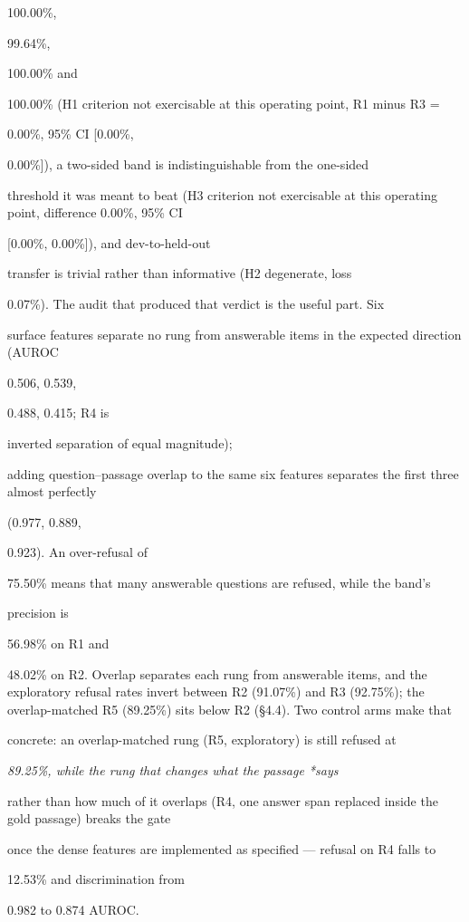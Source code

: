 100.00\%,

99.64\%,

100.00\% and

100.00\% (H1 criterion not exercisable at this operating point, R1 minus R3 =

0.00\%, 95\% CI [0.00\%,

0.00\%]), a two-sided band is indistinguishable from the one-sided

threshold it was meant to beat (H3 criterion not exercisable at this operating point, difference 0.00\%, 95\% CI

[0.00\%, 0.00\%]), and dev-to-held-out

transfer is trivial rather than informative (H2 degenerate, loss

0.07\%). The audit that produced that verdict is the useful part. Six

surface features separate no rung from answerable items in the expected direction (AUROC

0.506, 0.539,

0.488, 0.415; R4 is

inverted separation of equal magnitude);

adding question--passage overlap to the same six features separates the first three almost perfectly

(0.977, 0.889,

0.923). An over-refusal of

75.50\% means that many answerable questions are refused, while the band's

precision is

56.98\% on R1 and

48.02\% on R2. Overlap separates each rung from answerable items, and the exploratory refusal rates invert between R2 (91.07\%) and R3 (92.75\%); the overlap-matched R5 (89.25\%) sits below R2 (§4.4). Two control arms make that

concrete: an overlap-matched rung (R5, exploratory) is still refused at

\textit{89.25\%, while the rung that changes what the passage *says}

rather than how much of it overlaps (R4, one answer span replaced inside the gold passage) breaks the gate

once the dense features are implemented as specified --- refusal on R4 falls to

12.53\% and discrimination from

0.982 to 0.874 AUROC.

